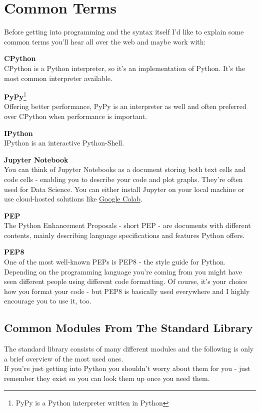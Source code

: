 \section{Common Terms}
    Before getting into programming and the syntax itself I'd like to explain some common terms
    you'll hear all over the web and maybe work with:

    \begin{indentblock}

        \textbf{CPython} \\
        CPython is a Python interpreter, so it's an implementation of Python.
        It's the most common interpreter available.

        \textbf{PyPy}\footnote{PyPy is a Python interpreter written in Python} \\
        Offering better performance, PyPy is an interpreter as well and often preferred over CPython
        when performance is important.

        \textbf{IPython} \\
        IPython is an interactive Python-Shell.

        \textbf{Jupyter Notebook} \\
        You can think of Jupyter Notebooks as a document storing both text cells and code cells -
        enabling you to describe your code and plot graphs. They're often used for Data Science.
        You can either install Jupyter on your local machine or use cloud-hosted solutions like
        \href{https://colab.research.google.com/}{Google Colab}.

        \textbf{PEP} \\
        The Python Enhancement Proposals - short PEP - are documents with different contents, mainly
        describing language specifications and features Python offers.

        \textbf{PEP8} \\
        One of the most well-known PEPs is PEP8 - the style guide for Python. \\
        Depending on the programming language you're coming from you might have seen different people
        using different code formatting.
        Of course, it's your choice how you format your code - but PEP8 is basically used everywhere and
        I highly encourage you to use it, too.

    \end{indentblock}

    \subsection{Common Modules From The Standard Library}
        The standard library consists of many different modules and the following is only a brief
        overview of the most used ones.\\
        If you're just getting into Python you shouldn't worry about them for you - just remember
        they exist so you can look them up once you need them.

